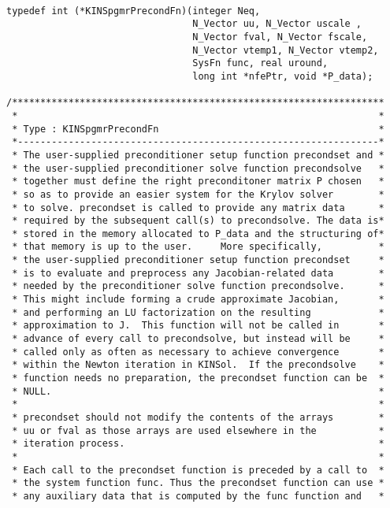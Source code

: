 \documentclass[11pt]{article}
\begin{document}
\small
\begin{verbatim}

typedef int (*KINSpgmrPrecondFn)(integer Neq, 
                                 N_Vector uu, N_Vector uscale ,
                                 N_Vector fval, N_Vector fscale,
                                 N_Vector vtemp1, N_Vector vtemp2,
                                 SysFn func, real uround,
                                 long int *nfePtr, void *P_data);
  
/******************************************************************
 *                                                                *     
 * Type : KINSpgmrPrecondFn                                       *
 *----------------------------------------------------------------*
 * The user-supplied preconditioner setup function precondset and *
 * the user-supplied preconditioner solve function precondsolve   *
 * together must define the right preconditoner matrix P chosen   *
 * so as to provide an easier system for the Krylov solver        *
 * to solve. precondset is called to provide any matrix data      *
 * required by the subsequent call(s) to precondsolve. The data is*
 * stored in the memory allocated to P_data and the structuring of*
 * that memory is up to the user.     More specifically,          *
 * the user-supplied preconditioner setup function precondset     *
 * is to evaluate and preprocess any Jacobian-related data        *
 * needed by the preconditioner solve function precondsolve.      *
 * This might include forming a crude approximate Jacobian,       *
 * and performing an LU factorization on the resulting            *
 * approximation to J.  This function will not be called in       *
 * advance of every call to precondsolve, but instead will be     *
 * called only as often as necessary to achieve convergence       *
 * within the Newton iteration in KINSol.  If the precondsolve    *
 * function needs no preparation, the precondset function can be  *
 * NULL.                                                          *
 *                                                                *
 * precondset should not modify the contents of the arrays        *
 * uu or fval as those arrays are used elsewhere in the           *
 * iteration process.                                             *
 *                                                                *
 * Each call to the precondset function is preceded by a call to  *
 * the system function func. Thus the precondset function can use *
 * any auxiliary data that is computed by the func function and   *

\end{verbatim}
\end{document}
